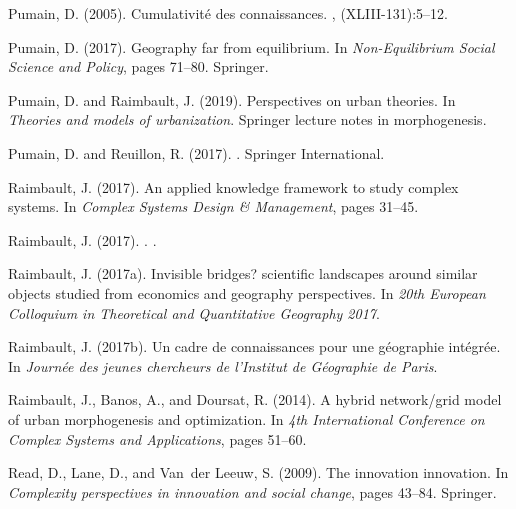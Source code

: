 \documentclass[graybox]{svmult}
\begin{document}
\begin{thebibliography}{}
Pumain, D. (2005).
\newblock Cumulativit{\'e} des connaissances.
, (XLIII-131):5--12.

Pumain, D. (2017).
\newblock Geography far from equilibrium.
\newblock In {\em Non-Equilibrium Social Science and Policy}, pages 71--80.
  Springer.

Pumain, D. and Raimbault, J. (2019).
\newblock Perspectives on urban theories.
\newblock In {\em Theories and models of urbanization}. Springer lecture notes
  in morphogenesis.

Pumain, D. and Reuillon, R. (2017).
.
\newblock Springer International.

Raimbault, J. (2017).
\newblock An applied knowledge framework to study complex systems.
\newblock In {\em Complex Systems Design \& Management}, pages 31--45.

{Raimbault}, J. (2017).
.
.

Raimbault, J. (2017a).
\newblock Invisible bridges? scientific landscapes around similar objects
  studied from economics and geography perspectives.
\newblock In {\em 20th European Colloquium in Theoretical and Quantitative
  Geography 2017}.

Raimbault, J. (2017b).
\newblock Un cadre de connaissances pour une g{\'e}ographie int{\'e}gr{\'e}e.
\newblock In {\em Journ{\'e}e des jeunes chercheurs de l'Institut de
  G{\'e}ographie de Paris}.

Raimbault, J., Banos, A., and Doursat, R. (2014).
\newblock A hybrid network/grid model of urban morphogenesis and optimization.
\newblock In {\em 4th International Conference on Complex Systems and
  Applications}, pages 51--60.

Read, D., Lane, D., and Van~der Leeuw, S. (2009).
\newblock The innovation innovation.
\newblock In {\em Complexity perspectives in innovation and social change},
  pages 43--84. Springer.


\end{thebibliography}
\end{document}

